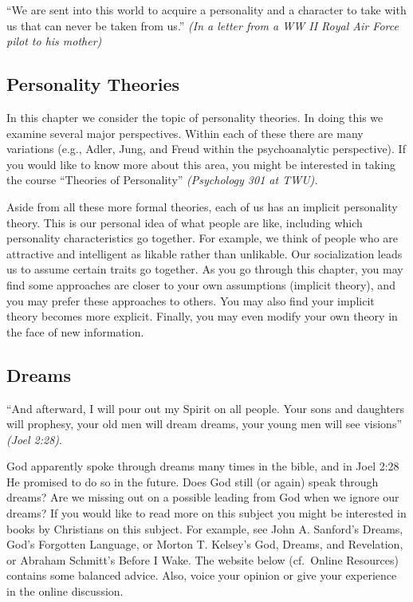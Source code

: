 \documentclass[
]{book}
\begin{document}
``We are sent into this world to acquire a personality and a character to take with us that can never be taken from us.'' \emph{(In a letter from a WW II Royal Air Force pilot to his mother)}

\hypertarget{personality-theories}{%
\subsection*{Personality Theories}\label{personality-theories}}

In this chapter we consider the topic of personality theories. In doing this we examine several major perspectives. Within each of these there are many variations (e.g., Adler, Jung, and Freud within the psychoanalytic perspective). If you would like to know more about this area, you might be interested in taking the course ``Theories of Personality'' \emph{(Psychology 301 at TWU).}

Aside from all these more formal theories, each of us has an implicit personality theory. This is our personal idea of what people are like, including which personality characteristics go together. For example, we think of people who are attractive and intelligent as likable rather than unlikable. Our socialization leads us to assume certain traits go together. As you go through this chapter, you may find some approaches are closer to your own assumptions (implicit theory), and you may prefer these approaches to others. You may also find your implicit theory becomes more explicit. Finally, you may even modify your own theory in the face of new information.

\hypertarget{dreams}{%
\subsection*{Dreams}\label{dreams}}

``And afterward, I will pour out my Spirit on all people. Your sons and daughters will prophesy, your old men will dream dreams, your young men will see visions'' \emph{(Joel 2:28)}.

God apparently spoke through dreams many times in the bible, and in Joel 2:28 He promised to do so in the future. Does God still (or again) speak through dreams? Are we missing out on a possible leading from God when we ignore our dreams? If you would like to read more on this subject you might be interested in books by Christians on this subject. For example, see John A. Sanford's Dreams, God's Forgotten Language, or Morton T. Kelsey's God, Dreams, and Revelation, or Abraham Schmitt's Before I Wake. The website below (cf.~Online Resources) contains some balanced advice. Also, voice your opinion or give your experience in the online discussion.
\end{document}
